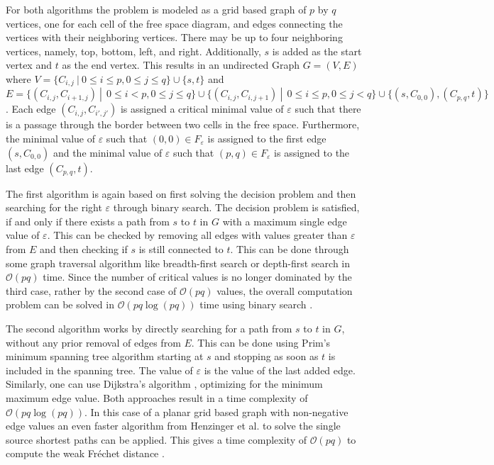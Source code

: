 \documentclass[
oneside,
fontsize=11pt
]{scrartcl}
\begin{document}
For both algorithms the problem is modeled as a grid based graph of $p$ by $q$ vertices, 
one for each cell of the free space diagram,
and edges connecting the vertices with their neighboring vertices.
There may be up to four neighboring vertices, namely, 
top, bottom, left, and right.
Additionally, $s$ is added as the start vertex and $t$ as the end vertex.
This results in an undirected Graph $G=(V,E)$ 
where $V = \{C_{i,j} \ | \ 0 \leq i \leq p, 0 \leq j \leq q \} \cup \{s,t\}$
and $E=\{(C_{i,j}, C_{i+1,j}) \ | \ \ 0 \leq i < p, 0 \leq j \leq q\} \cup \{(C_{i,j}, C_{i,j+1}) \ | \ \ 0 \leq i \leq p, 0 \leq j < q\} \cup \{(s, C_{0,0}), (C_{p,q}, t)\}$.
Each edge $(C_{i,j}, C_{i',j'})$ is assigned a critical minimal value of $\varepsilon$ 
such that there is a passage through the border between two cells in the free space. 
Furthermore, the minimal value of $\varepsilon$ such that $(0,0) \in F_\varepsilon$ is assigned to the first edge $(s, C_{0,0})$ 
and the minimal value of $\varepsilon$ such that $(p,q) \in F_\varepsilon$ is assigned to the last edge $(C_{p,q}, t)$. \cite{alt_computing_1995}

The first algorithm is again based on first solving the decision problem 
and then searching for the right $\varepsilon$ through binary search.
The decision problem is satisfied, if and only if there exists a path from $s$ to $t$ in $G$ 
with a maximum single edge value of $\varepsilon$.
This can be checked by removing all edges with values greater than $\varepsilon$ from $E$ 
and then checking if $s$ is still connected to $t$. 
This can be done through some graph traversal algorithm like breadth-first search or depth-first search
in $\mathcal{O}(pq)$ time. \cite{alt_computing_1995}
Since the number of critical values is no longer dominated by the third case,
rather by the second case of $\mathcal{O}(pq)$ values, 
the overall computation problem can be solved in $\mathcal{O}(pq \log (pq))$ time using binary search \cite{van_leusden_novel_2013}. 

The second algorithm works by directly searching for a path from $s$ to $t$ in $G$,
without any prior removal of edges from $E$.
This can be done using Prim's minimum spanning tree algorithm \cite{prim_shortest_1957} starting at $s$ 
and stopping as soon as $t$ is included in the spanning tree. 
The value of $\varepsilon$ is the value of the last added edge.
Similarly, one can use Dijkstra's algorithm \cite{dijkstra_note_1959}, 
optimizing for the minimum maximum edge value.
Both approaches result in a time complexity of $\mathcal{O}(pq \log (pq))$. \cite{alt_computing_1995}
In this case of a planar grid based graph with non-negative edge values 
an even faster algorithm from Henzinger et al. \cite{henzinger_faster_1997} to solve the single source shortest paths 
can be applied. This gives a time complexity of $\mathcal{O}(pq)$ to compute the weak Fréchet distance \cite{van_leusden_novel_2013}.
\end{document}
